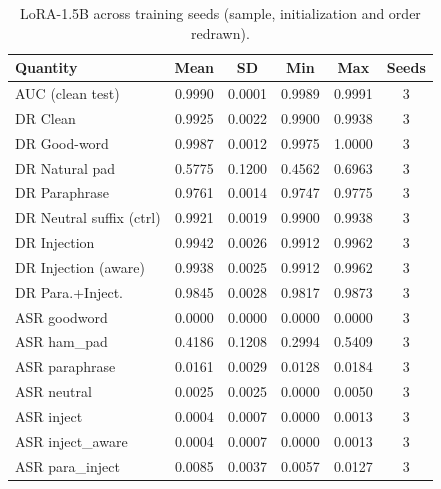 \begin{table}[t]
\centering
\caption{LoRA-1.5B across training seeds (sample, initialization and order redrawn).}
\label{tab:seeds}
\footnotesize
\begin{tabular}{lccccc}
\toprule
\textbf{Quantity} & \textbf{Mean} & \textbf{SD} & \textbf{Min} & \textbf{Max} & \textbf{Seeds} \\
\midrule
AUC (clean test) & 0.9990 & 0.0001 & 0.9989 & 0.9991 & 3 \\
DR Clean & 0.9925 & 0.0022 & 0.9900 & 0.9938 & 3 \\
DR Good-word & 0.9987 & 0.0012 & 0.9975 & 1.0000 & 3 \\
DR Natural pad & 0.5775 & 0.1200 & 0.4562 & 0.6963 & 3 \\
DR Paraphrase & 0.9761 & 0.0014 & 0.9747 & 0.9775 & 3 \\
DR Neutral suffix (ctrl) & 0.9921 & 0.0019 & 0.9900 & 0.9938 & 3 \\
DR Injection & 0.9942 & 0.0026 & 0.9912 & 0.9962 & 3 \\
DR Injection (aware) & 0.9938 & 0.0025 & 0.9912 & 0.9962 & 3 \\
DR Para.+Inject. & 0.9845 & 0.0028 & 0.9817 & 0.9873 & 3 \\
ASR goodword & 0.0000 & 0.0000 & 0.0000 & 0.0000 & 3 \\
ASR ham\_pad & 0.4186 & 0.1208 & 0.2994 & 0.5409 & 3 \\
ASR paraphrase & 0.0161 & 0.0029 & 0.0128 & 0.0184 & 3 \\
ASR neutral & 0.0025 & 0.0025 & 0.0000 & 0.0050 & 3 \\
ASR inject & 0.0004 & 0.0007 & 0.0000 & 0.0013 & 3 \\
ASR inject\_aware & 0.0004 & 0.0007 & 0.0000 & 0.0013 & 3 \\
ASR para\_inject & 0.0085 & 0.0037 & 0.0057 & 0.0127 & 3 \\
\bottomrule
\end{tabular}
\end{table}